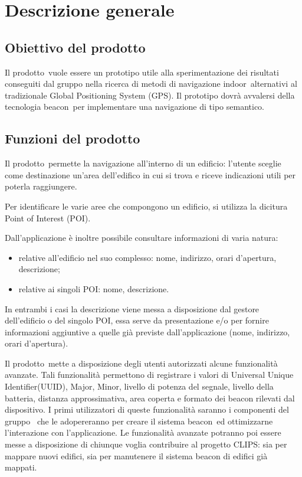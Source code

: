 \documentclass[../AnalisiDeiRequisiti.tex]{subfiles}
\begin{document}
\section{Descrizione generale}
	\subsection{Obiettivo del prodotto}
	Il prodotto\g\ vuole essere un prototipo utile alla sperimentazione dei risultati conseguiti dal gruppo nella ricerca di metodi di navigazione indoor\g\ alternativi al tradizionale Global Positioning System (GPS).
Il prototipo dovrà avvalersi della tecnologia beacon\g\ per implementare una navigazione di tipo semantico.

	\subsection{Funzioni del prodotto}
	Il prodotto\g\ permette la navigazione all’interno di un edificio: l’utente sceglie come destinazione un'area dell’edifico in cui si trova e riceve indicazioni utili per poterla raggiungere. 
	
	Per identificare le varie aree che compongono un edificio, si utilizza la dicitura Point of Interest (POI\g).
	
	Dall'applicazione è inoltre possibile consultare informazioni di varia natura:
	\begin{itemize}
		\item relative all’edificio nel suo complesso: nome, indirizzo, orari d'apertura, descrizione;
		\item relative ai singoli POI\g: nome, descrizione.
	\end{itemize}
	In entrambi i casi la descrizione viene messa a disposizione dal gestore dell'edificio o del singolo POI\g, essa serve da presentazione e/o per fornire informazioni aggiuntive a quelle già previste dall'applicazione (nome, indirizzo, orari d'apertura). 
	
	Il prodotto\g\ mette a disposizione degli utenti autorizzati alcune funzionalità avanzate. Tali funzionalità permettono di registrare  i valori di Universal Unique Identifier(UUID), Major, Minor, livello di potenza del segnale, livello della batteria, distanza approssimativa, area coperta e formato dei beacon rilevati dal dispositivo. I primi utilizzatori di queste funzionalità saranno i componenti del gruppo \leaf\ che le adopereranno per creare il sistema beacon\g\ ed ottimizzarne l'interazione con l'applicazione. Le funzionalità avanzate potranno poi essere messe a disposizione di chiunque voglia contribuire al progetto CLIPS: sia per mappare nuovi edifici, sia per manutenere il sistema beacon di edifici già mappati.
		
\end{document}
